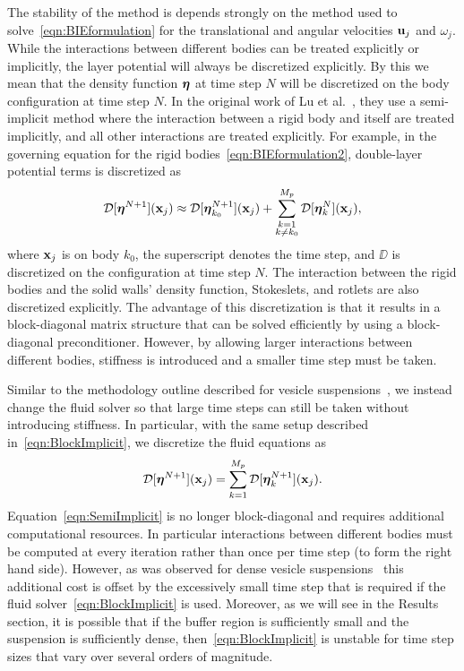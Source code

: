 \documentclass[preprint, 10pt]{elsarticle}
\begin{document}
The stability of the method is depends strongly on the method used to
solve~\eqref{eqn:BIEformulation} for the translational and angular velocities ${\mathbf{u}}_j$ and $\omega_j$.
While the interactions between different bodies can be treated
explicitly or implicitly, the layer potential will always be discretized
explicitly. By this we mean that the density function ${\boldsymbol\eta}$ at time step $N$ will be discretized on the body configuration at time step $N$. 
In the original work of Lu et al.~\cite{Lu2017}, they use a
semi-implicit method where the interaction between a rigid body and
itself are treated implicitly, and all other interactions are treated
explicitly.  For example, in the governing equation for the rigid
bodies~\eqref{eqn:BIEformulation2}, double-layer potential
terms is discretized as
\begin{align}
 {\mathcal{D}}[{\boldsymbol\eta}^{N+1}]({\mathbf{x}}_j) \approx
  {\mathcal{D}}[{\boldsymbol\eta}^{N+1}_{k_0}]({\mathbf{x}}_j) + 
  \sum_{\substack{k=1 \\ k \neq k_0}}^{M_p} {\mathcal{D}}[{\boldsymbol\eta}^{N}_k]({\mathbf{x}}_j),
  \label{eqn:BlockImplicit}
\end{align}
where ${\mathbf{x}}_j$ is on body $k_0$, the superscript denotes the time
step, and $\DD$ is discretized on the configuration at time step $N$.  The interaction between the rigid bodies and the solid walls'
density function, Stokeslets, and rotlets are also discretized
explicitly.  The advantage of this discretization is that it results in
a block-diagonal matrix structure that can be solved efficiently by using a block-diagonal preconditioner.  However, by allowing
larger interactions between different bodies, stiffness is introduced
and a smaller time step must be taken. 

Similar to the methodology
outline described for vesicle suspensions~\cite{Quaife2014}, we instead
change the fluid solver so that large time steps can still be taken
without introducing stiffness.  In particular, with the same setup
described in~\eqref{eqn:BlockImplicit}, we discretize the fluid
equations as
\begin{align}
  {\mathcal{D}}[{\boldsymbol\eta}^{N+1}]({\mathbf{x}}_j) = 
  \sum_{k=1}^{M_p} {\mathcal{D}}[{\boldsymbol\eta}^{N+1}_k]({\mathbf{x}}_j).
  \label{eqn:SemiImplicit}
\end{align}
Equation~\eqref{eqn:SemiImplicit} is no longer block-diagonal and requires additional computational
resources. In particular
interactions between different bodies must be computed at every
iteration rather than once per time step (to form the right hand side).
However, as was observed for dense vesicle suspensions~\cite{Quaife2014, Rahimian2015} this additional cost is offset by the
excessively small time step that is required if the fluid
solver~\eqref{eqn:BlockImplicit} is used.  Moreover, as we will see in
the Results section, it is possible that if the buffer region is
sufficiently small and the suspension is sufficiently dense,
then~\eqref{eqn:BlockImplicit} is unstable for time step sizes that vary
over several orders of magnitude.
\end{document}
